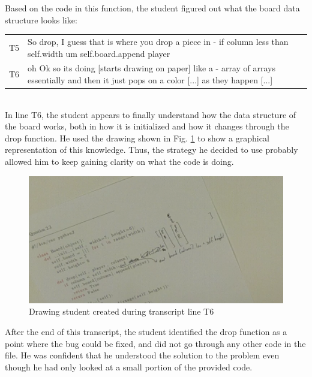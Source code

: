 Based on the code in this function, the student figured out what the board data structure looks like: \\
\begin{tabular}{lp{13cm}}
T5& So drop, I guess that is where you drop a piece in - if column less than self.width um self.board.append player \\
T6&oh Ok so its doing  [starts drawing on paper] like a - array of arrays essentially and then it just pops on a color [...] as they happen [...] \\
\end{tabular}\\
In line T6, the student appears to finally understand how the data structure of the board works, both in how it is initialized and how it changes through the drop function. He used the drawing shown in Fig. \ref{fig-q4-drawing} to show a graphical representation of this knowledge. 
Thus, the strategy he decided to use probably allowed him to keep gaining clarity on what the code is doing. \\

\begin{figure}[t]
\centering
\includegraphics[width=1.0\textwidth]{2_2drawing.png}
\caption{Drawing student created during transcript line T6}
\label{fig-q4-drawing}
\end{figure}

After the end of this transcript, the student identified the drop function as a point where the bug could be fixed, and did not go through any other code in the file. 
He was confident that he understood the solution to the problem even though he had only looked at a small portion of the provided code. 



